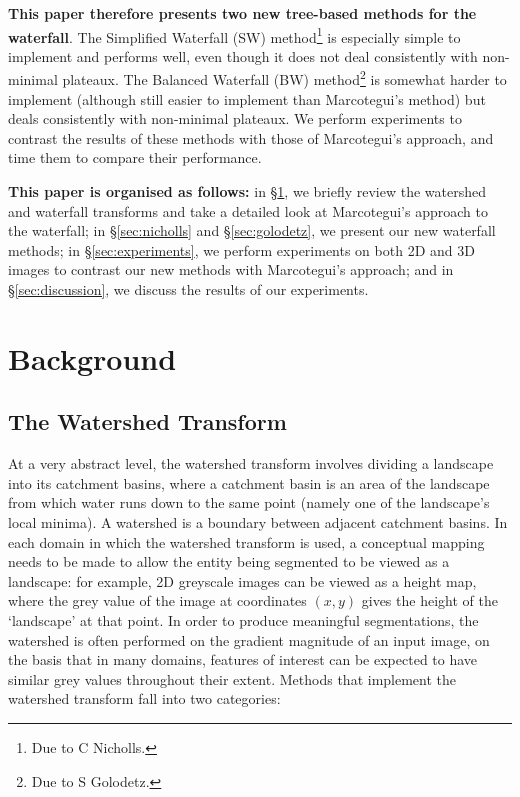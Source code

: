 \documentclass[preprint,a4paper]{elsarticle}
\begin{document}
\pagebreak

\textbf{This paper therefore presents two new tree-based methods for the waterfall}. The Simplified Waterfall (SW) method\footnote{Due to C Nicholls.} is especially simple to implement and performs well, even though it does not deal consistently with non-minimal plateaux. The Balanced Waterfall (BW) method\footnote{Due to S Golodetz.} is somewhat harder to implement (although still easier to implement than Marcotegui's method) but deals consistently with non-minimal plateaux. We perform experiments to contrast the results of these methods with those of Marcotegui's approach, and time them to compare their performance.

\textbf{This paper is organised as follows:} in \S\ref{sec:background}, we briefly review the watershed and waterfall transforms and take a detailed look at Marcotegui's approach to the waterfall; in \S\ref{sec:nicholls} and \S\ref{sec:golodetz}, we present our new waterfall methods; in \S\ref{sec:experiments}, we perform experiments on both 2D and 3D images to contrast our new methods with Marcotegui's approach; and in \S\ref{sec:discussion}, we discuss the results of our experiments.

\section{Background}
\label{sec:background}

\subsection{The Watershed Transform}

At a very abstract level, the watershed transform involves dividing a landscape into its catchment basins, where a catchment basin is an area of the landscape from which water runs down to the same point (namely one of the landscape's local minima). A watershed is a boundary between adjacent catchment basins. In each domain in which the watershed transform is used, a conceptual mapping needs to be made to allow the entity being segmented to be viewed as a landscape: for example, 2D greyscale images can be viewed as a height map, where the grey value of the image at coordinates $(x,y)$ gives the height of the `landscape' at that point. In order to produce meaningful segmentations, the watershed is often performed on the gradient magnitude of an input image, on the basis that in many domains, features of interest can be expected to have similar grey values throughout their extent. Methods that implement the watershed transform fall into two categories:
\end{document}
